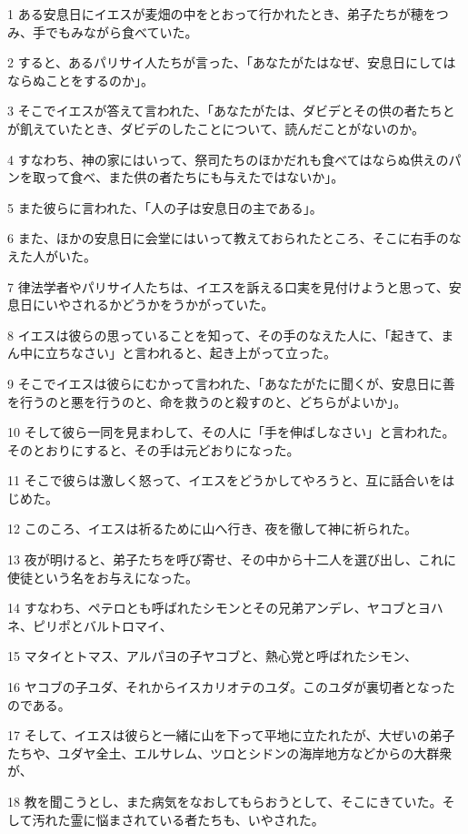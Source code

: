 \par 1 ある安息日にイエスが麦畑の中をとおって行かれたとき、弟子たちが穂をつみ、手でもみながら食べていた。
\par 2 すると、あるパリサイ人たちが言った、「あなたがたはなぜ、安息日にしてはならぬことをするのか」。
\par 3 そこでイエスが答えて言われた、「あなたがたは、ダビデとその供の者たちとが飢えていたとき、ダビデのしたことについて、読んだことがないのか。
\par 4 すなわち、神の家にはいって、祭司たちのほかだれも食べてはならぬ供えのパンを取って食べ、また供の者たちにも与えたではないか」。
\par 5 また彼らに言われた、「人の子は安息日の主である」。
\par 6 また、ほかの安息日に会堂にはいって教えておられたところ、そこに右手のなえた人がいた。
\par 7 律法学者やパリサイ人たちは、イエスを訴える口実を見付けようと思って、安息日にいやされるかどうかをうかがっていた。
\par 8 イエスは彼らの思っていることを知って、その手のなえた人に、「起きて、まん中に立ちなさい」と言われると、起き上がって立った。
\par 9 そこでイエスは彼らにむかって言われた、「あなたがたに聞くが、安息日に善を行うのと悪を行うのと、命を救うのと殺すのと、どちらがよいか」。
\par 10 そして彼ら一同を見まわして、その人に「手を伸ばしなさい」と言われた。そのとおりにすると、その手は元どおりになった。
\par 11 そこで彼らは激しく怒って、イエスをどうかしてやろうと、互に話合いをはじめた。
\par 12 このころ、イエスは祈るために山へ行き、夜を徹して神に祈られた。
\par 13 夜が明けると、弟子たちを呼び寄せ、その中から十二人を選び出し、これに使徒という名をお与えになった。
\par 14 すなわち、ペテロとも呼ばれたシモンとその兄弟アンデレ、ヤコブとヨハネ、ピリポとバルトロマイ、
\par 15 マタイとトマス、アルパヨの子ヤコブと、熱心党と呼ばれたシモン、
\par 16 ヤコブの子ユダ、それからイスカリオテのユダ。このユダが裏切者となったのである。
\par 17 そして、イエスは彼らと一緒に山を下って平地に立たれたが、大ぜいの弟子たちや、ユダヤ全土、エルサレム、ツロとシドンの海岸地方などからの大群衆が、
\par 18 教を聞こうとし、また病気をなおしてもらおうとして、そこにきていた。そして汚れた霊に悩まされている者たちも、いやされた。
